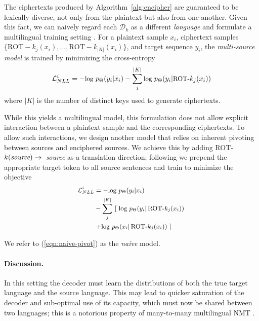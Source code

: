 \documentclass[11pt]{article}
\begin{document}
The ciphertexts produced by Algorithm~\ref{alg:encipher} are guaranteed to be lexically diverse, not only from the plaintext but also from one another.
Given this fact, we can naively regard each $\mathcal{D}_k$ as a different \emph{language} and formulate a multilingual training setting \cite{johnson2017google}. For a plaintext sample $x_i$, ciphertext samples $\{\mathrm{ROT-}k_j(x_i), ..., \mathrm{ROT-}k_{|K|}(x_i)\}$, and target sequence $y_i$, the \emph{multi-source model} is trained by minimizing the cross-entropy
\begin{equation}\label{eqn:naive-nll}
    \small
    \mathcal{L}_{NLL}^i = - \text{log } p_\Theta(y_i | x_i) - \sum_{j}^{|K|}\text{log } p_\Theta(y_i | \text{ROT-}k_j(x_i))
\end{equation}
where $|K|$ is the number of distinct keys used to generate ciphertexts. 

While this yields a multilingual model, this formulation does not allow explicit interaction between a plaintext sample and the corresponding ciphertexts. 
To allow such interactions, we design another model that relies on inherent pivoting between sources and enciphered sources. 
We achieve this by adding \hbox{ROT-$k(\emph{source}) \rightarrow$ \emph{source}} as a translation direction; following \citet{johnson2017google} we prepend the appropriate target token to all  source sentences and train to minimize the objective
\begin{equation}\label{eqn:naive-pivot}
    \small
    \begin{split}
        \mathcal{L}_{NLL}^i &= - \text{log } p_\Theta(y_i | x_i) \\ 
        &- \sum_{j}^{|K|}\, \left[\,\, \text{log } p_\Theta(y_i |\, \text{ROT-}k_j(x_i)) \right.\\
        &\left.+ \text{log } p_\Theta(x_i |\, \text{ROT-}k_j(x_i)) \,\,\right] \\
    \end{split}
\end{equation}

We refer to (\ref{eqn:naive-pivot}) as the \textit{naive} model.

\paragraph{Discussion.} 
In this setting the decoder must learn the distributions of both the true target language and the source language.
This may lead to quicker saturation of the decoder and sub-optimal use of its capacity, which must now be shared between two languages; this is a notorious property of many-to-many multilingual NMT \cite{aharoni-etal-2019-massively}.
\end{document}
